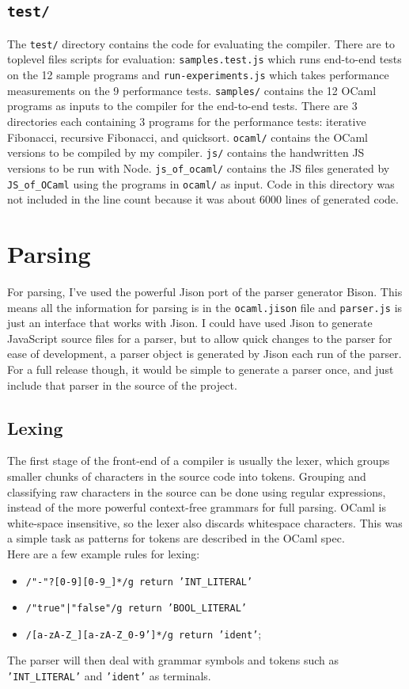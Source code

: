 \documentclass[12pt,a4paper,twoside,openright]{report}
\newcommand{\JSofOCaml}{{\tt JS\_of\_OCaml} }
\begin{document}
\subsection*{{\tt test/}}
The {\tt test/} directory contains the code for evaluating the compiler.
There are to toplevel files scripts for evaluation: {\tt samples.test.js} which runs end-to-end tests on the 12 sample programs and {\tt run-experiments.js} which takes performance measurements on the 9 performance tests.
{\tt samples/} contains the 12 OCaml programs as inputs to the compiler for the end-to-end tests.
There are 3 directories each containing 3 programs for the performance tests: iterative Fibonacci, recursive Fibonacci, and quicksort.
{\tt ocaml/} contains the OCaml versions to be compiled by my compiler.
{\tt js/} contains the handwritten JS versions to be run with Node.
{\tt js\_of\_ocaml/} contains the JS files generated by \JSofOCaml using the programs in {\tt ocaml/} as input.
Code in this directory was not included in the line count because it was about 6000 lines of generated code.

\section{Parsing}
For parsing, I've used the powerful Jison port of the parser generator Bison.
This means all the information for parsing is in the {\tt ocaml.jison} file and {\tt parser.js} is just an interface that works with Jison.
I could have used Jison to generate JavaScript source files for a parser, but to allow quick changes to the parser for ease of development, a parser object is generated by Jison each run of the parser.
For a full release though, it would be simple to generate a parser once, and just include that parser in the source of the project.

\subsection{Lexing}
The first stage of the front-end of a compiler is usually the lexer, which groups smaller chunks of characters in the source code into tokens.
Grouping and classifying raw characters in the source can be done using regular expressions, instead of the more powerful context-free grammars for full parsing.
OCaml is white-space insensitive, so the lexer also discards whitespace characters.
This was a simple task as patterns for tokens are described in the OCaml spec. \\
Here are a few example rules for lexing:
\begin{itemize}
   \item {\tt /"-"?[0-9][0-9\_]*/g return 'INT\_LITERAL'}
   \item {\tt /"true"|"false"/g return 'BOOL\_LITERAL'}
   \item {\tt /[a-zA-Z\_][a-zA-Z\_0-9']*/g return 'ident'};
\end{itemize}
The parser will then deal with grammar symbols and tokens such as {\tt 'INT\_LITERAL'} and {\tt 'ident'} as terminals.
\end{document}
